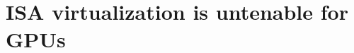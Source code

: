 \chapter{ISA virtualization is untenable for GPUs}
\label{sec:trillium}

\def\gpuvmdef{\textsc{GPU\-vm-default}\xspace}
\def\gpuvmopt{\textsc{GPU\-vm-opt}\xspace}
\def\trxc{\textsc{Xen-SVGA}\xspace}
\def\trxc{\textsc{Xen-SVGA}\xspace}
\def\trillium{\textsc{{T}rillium}\xspace}
\def\Trillium{\textsc{{T}rillium}\xspace}
\def\trxd{\Trillium}
\def\apigpu{\textsc{API-remote-GPU}\xspace}
\def\apicpu{\textsc{API-remote-CPU}\xspace}
\def\shadowpipe{\texttt{shadow-pipe}\xspace}
\def\Shadowpipe{\texttt{Shadow-pipe}\xspace}
\def\vframework{\textsc{{IEMTS}}\xspace}







